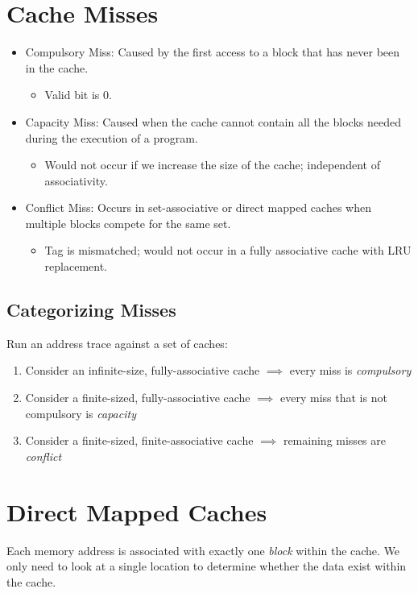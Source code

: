 \section{Cache Misses}
\begin{itemize}
    \item Compulsory Miss: Caused by the first access to a block that has never been in the cache.
     \begin{itemize}
        \item Valid bit is 0.
    \end{itemize}
    \item Capacity Miss: Caused when the cache cannot contain all the blocks needed during the execution of a program.
    \begin{itemize}
        \item Would not occur if we increase the size of the cache; independent of associativity.
    \end{itemize}
    \item Conflict Miss: Occurs in set-associative or direct mapped caches when multiple blocks compete for the same set.
    \begin{itemize}
        \item Tag is mismatched; would not occur in a fully associative cache with LRU replacement.
    \end{itemize}
\end{itemize}

\subsection{Categorizing Misses}
Run an address trace against a set of caches:
\begin{enumerate}
    \item Consider an infinite-size, fully-associative cache $\implies$ every miss is \emph{compulsory}
    \item Consider a finite-sized, fully-associative cache $\implies$ every miss that is not compulsory is \emph{capacity}
    \item Consider a finite-sized, finite-associative cache $\implies$ remaining misses are \emph{conflict}
\end{enumerate}

\section{Direct Mapped Caches}
Each memory address is associated with exactly one \emph{block} within the cache. We only need to look at a single location to determine whether the data exist within the cache.

